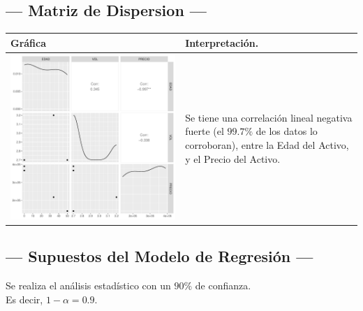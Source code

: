 \subsection{\centering --- Matriz de Dispersion ---} %
\begin{center}
  \begin{tabular}{|p{11cm}|p{5cm}|}
    \hline
    Gráfica & Interpretación. \\ \hline 
    \begin{minipage}{\textwidth}
    \includegraphics[width= 0.5 \linewidth, page=1]{../0.documentos/3_MERGED_MARKET/3_BOMBO_BATIDOR/r/Rplots.pdf}
    \end{minipage} 
    &
		Se tiene una correlación lineal negativa fuerte (el \(99.7\%\) de los datos lo corroboran),
		entre la Edad del Activo, y el Precio del Activo.
		\\ \hline 
  \end{tabular}
\end{center} 

\subsection{\centering --- Supuestos del Modelo de Regresión ---} %

Se realiza el análisis estadístico con un \(90\%\) de confianza. \\ 
Es decir, \(1- \alpha = 0.9\).

